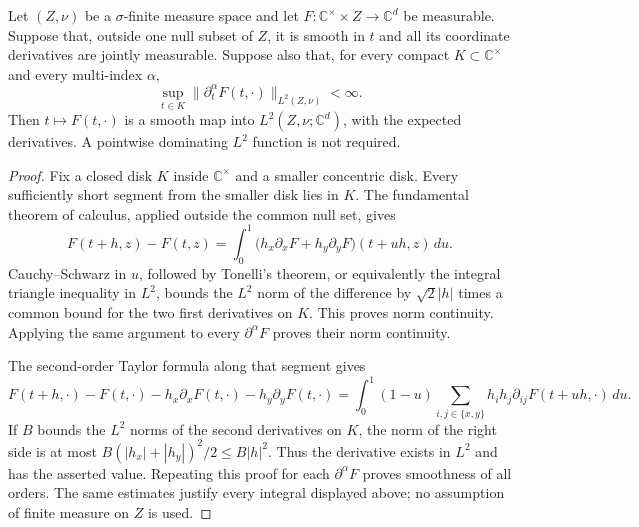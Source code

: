 \begin{lemma}\label{rf-L2-smoothness}
Let $(Z,\nu)$ be a $\sigma$-finite measure space and let
$F:\mathbb C^\times\times Z\to\mathbb C^d$ be measurable.
Suppose that, outside one null subset of $Z$, it is smooth
in $t$ and all its coordinate derivatives are jointly
measurable.  Suppose also that, for every compact
$K\subset\mathbb C^\times$ and every multi-index $\alpha$,
\begin{equation}\label{rf-local-L2-bounds}
       \sup_{t\in K}
          \|\partial^\alpha_tF(t,\cdot)\|_{L^2(Z,\nu)}
                                                     <\infty.
\end{equation}
Then $t\mapsto F(t,\cdot)$ is a smooth map into
$L^2(Z,\nu;\mathbb C^d)$, with the expected derivatives.
A pointwise dominating $L^2$ function is not required.
\end{lemma}

\begin{proof}
Fix a closed disk $K$ inside $\mathbb C^\times$ and a
smaller concentric disk.  Every sufficiently short
segment from the smaller disk lies in $K$.
The fundamental theorem of calculus, applied outside
the common null set, gives
\[
 F(t+h,z)-F(t,z)
       =\int_0^1\bigl(h_x\partial_xF+h_y\partial_yF\bigr)
                                                    (t+uh,z)\,du.
\]
Cauchy--Schwarz in $u$, followed by Tonelli's theorem,
or equivalently the integral triangle inequality in
$L^2$, bounds the $L^2$ norm of the difference by
$\sqrt2|h|$ times a common bound for the two first
derivatives on $K$.  This proves norm continuity.
Applying the same argument to every
$\partial^\alpha F$ proves their norm continuity.

The second-order Taylor formula along that segment
gives
\[
 F(t+h,\cdot)-F(t,\cdot)
       -h_x\partial_xF(t,\cdot)-h_y\partial_yF(t,\cdot)
 =\int_0^1(1-u)
       \sum_{i,j\in\{x,y\}}h_i h_j\partial_{ij}F(t+uh,\cdot)\,du.
\]
If $B$ bounds the $L^2$ norms of the second derivatives
on $K$, the norm of the right side is at most
$B(|h_x|+|h_y|)^2/2\leq B|h|^2$.
Thus the derivative exists in $L^2$ and has the asserted
value.  Repeating this proof for each
$\partial^\alpha F$ proves smoothness of all orders.
The same estimates justify every integral displayed
above; no assumption of finite measure on $Z$ is used.
\end{proof}

